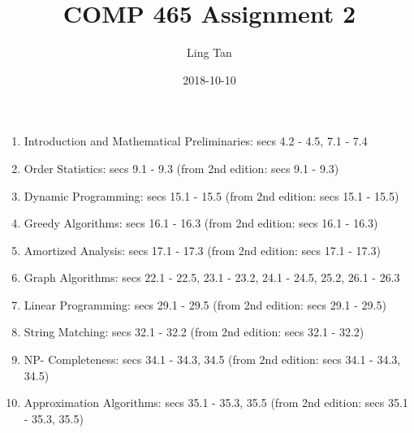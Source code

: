 \documentclass[a4paper]{article}
\title{COMP 465 Assignment 2}
\date{2018-10-10}
\author{Ling Tan}
\begin{document}
\maketitle

\begin{enumerate}
    \item Introduction and Mathematical Preliminaries: secs 4.2 - 4.5, 7.1 - 7.4 \item Order Statistics: secs 9.1 - 9.3 (from 2nd edition: secs 9.1 - 9.3)
    \item Dynamic Programming: secs 15.1 - 15.5 (from 2nd edition: secs 15.1 - 15.5)
    \item Greedy Algorithms: secs 16.1 - 16.3 (from 2nd edition: secs 16.1 - 16.3)
    \item Amortized Analysis: secs 17.1 - 17.3 (from 2nd edition: secs 17.1 - 17.3)
    \item Graph Algorithms: secs 22.1 - 22.5, 23.1 - 23.2, 24.1 - 24.5, 25.2, 26.1 - 26.3
    \item Linear Programming: secs 29.1 - 29.5 (from 2nd edition: secs 29.1 - 29.5)
    \item String Matching: secs 32.1 - 32.2 (from 2nd edition: secs 32.1 - 32.2)
    \item NP- Completeness: secs 34.1 - 34.3, 34.5 (from 2nd edition: secs 34.1 - 34.3, 34.5)
    \item Approximation Algorithms: secs 35.1 - 35.3, 35.5 (from 2nd edition: secs 35.1 - 35.3, 35.5)
\end{enumerate}
\end{document}
